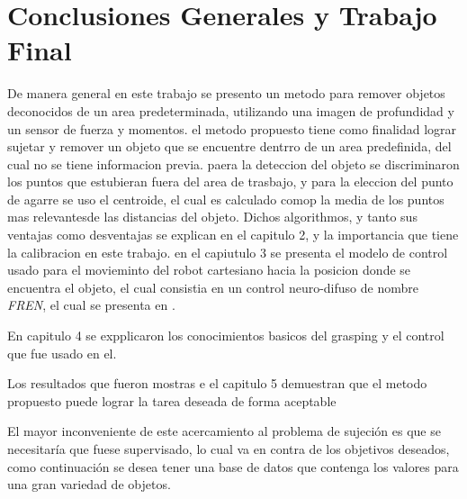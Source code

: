 \chapter{Conclusiones Generales y Trabajo Final}












De manera general en este trabajo se presento un metodo para remover objetos deconocidos de un area predeterminada, utilizando una imagen de profundidad y un sensor de fuerza y momentos.
el metodo propuesto tiene como finalidad lograr sujetar y remover un objeto que se encuentre dentrro de un area predefinida, del cual no se tiene informacion previa.
paera la deteccion del objeto se discriminaron los puntos que estubieran fuera del area de trasbajo, y para la eleccion del punto de agarre se uso el centroide, el cual es calculado comop la media de los puntos mas relevantesde las distancias del objeto. Dichos algorithmos, y tanto sus ventajas como desventajas se explican en el capitulo 2, y la importancia que tiene la calibracion en este trabajo. 
 en el capiutulo 3 se presenta el modelo de control usado para el movieminto del robot cartesiano hacia la posicion donde se encuentra el objeto, el cual consistia en un control neuro-difuso de nombre \textit{FREN}, el cual se presenta en \cite{fren}.
 
 En capitulo 4 se expplicaron los conocimientos basicos del grasping y el control que fue usado en el.
 
 
 Los resultados que fueron mostras e el capitulo 5 demuestran que el metodo propuesto puede lograr la tarea deseada de forma aceptable%
 



El mayor inconveniente de este acercamiento al problema de sujeción es que se necesitaría que fuese supervisado, lo cual va en contra de los objetivos deseados, como continuación se desea tener una base de datos que contenga los valores para una gran variedad de objetos.


